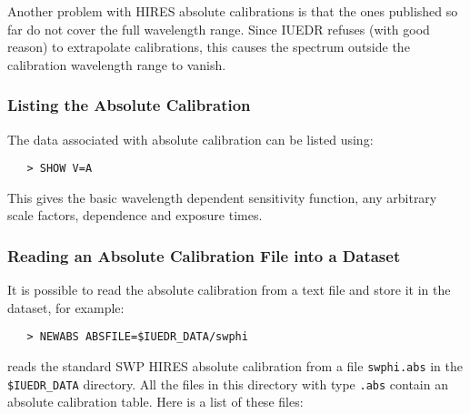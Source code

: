 Another problem with HIRES absolute calibrations is that the ones published so
far do not cover the full wavelength range.  Since IUEDR refuses (with good
reason) to extrapolate calibrations, this causes the spectrum outside the
calibration wavelength range to vanish.

\subsubsection{Listing the Absolute Calibration}

The data associated with absolute calibration can be listed using:

\begin{verbatim}
   > SHOW V=A
\end{verbatim}

This gives the basic wavelength dependent sensitivity function, any
arbitrary scale factors, 
 dependence and exposure times.

\subsubsection{Reading an Absolute Calibration File into a Dataset}

It is possible to read the absolute calibration from a text file and store it
in the dataset, for example:

\begin{verbatim}
   > NEWABS ABSFILE=$IUEDR_DATA/swphi
\end{verbatim}

reads the standard SWP HIRES absolute calibration from a file
\verb+swphi.abs+ in the \verb+$IUEDR_DATA+ directory.  All the files in this
directory with type \verb+.abs+ contain an absolute calibration table.
Here is a list of these files:

